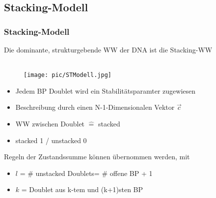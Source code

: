 



\subsection{Stacking-Modell}
\begin{frame}
\frametitle{Stacking-Modell}
\small Die dominante, strukturgebende WW der DNA ist die Stacking-WW \\
\\
\begin{minipage}{5.2cm}
\begin{figure}[h]
	\centering
		\texttt{[image: pic/STModell.jpg]}
\end{figure}
\centering
\tiny\cite{GOT83}
\end{minipage}
\begin{minipage}{5.0cm}
\small{
\begin{itemize}
\item Jedem BP Doublet wird ein Stabilitätsparamter zugewiesen
\item Beschreibung durch einen N-1-Dimensionalen Vektor $\vec{c}$
\item WW zwischen Doublet $\hat{=}$ stacked
\item stacked 1 / unstacked 0
\end{itemize}
}
\end{minipage}

\begin{flushleft}
Regeln der Zustandssumme können übernommen werden, mit
\begin{itemize}
\item $l$ = \# unstacked Doublets= \# offene BP + 1
\item $k$ = Doublet aus k-tem und (k+1)sten BP
\end{itemize}
\end{flushleft}
\end{frame}

